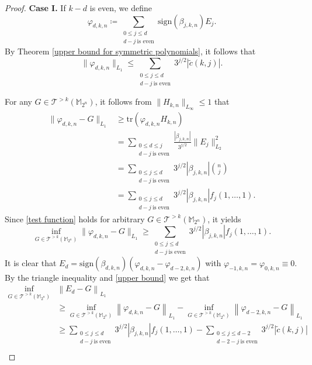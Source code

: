 \documentclass{amsbook}
\theoremstyle{definition}
\theoremstyle{remark}
\numberwithin{section}{chapter}
\numberwithin{equation}{chapter}
\newcommand{\M}{\mathbb{M}}
\newcommand{\1}{\mathbf{1}}
\begin{document}
\begin{proof}
{\bf Case I.} If $k-d$ is even, we define
\[
\varphi_{d,k,n}\coloneqq \sum_{\substack{0\leq j\leq d\\d-j~\mbox{is even}}}\mathrm{sign}(\beta_{j,k,n})E_{j}.
\]
By Theorem \ref{upper bound for symmetric polynomials}, it follows that
\begin{equation}\label{upper bound}
\|\varphi_{d,k,n}\|_{L_{1}}\leq \sum_{\substack{0\leq j\leq d\\d-j~\mbox{is even}}}3^{j/2}|\tilde{c}(k,j)|.
\end{equation}

For any $G\in \mathcal{T}^{>k}(\M_{2^n})$, it follows from $\|H_{k,n}\|_{L_{\infty}}\leq 1$ that
\begin{equation}\label{test function}
\begin{split}
\|\varphi_{d,k,n}-G\|_{L_{1}}&\geq\mathrm{tr}\left(\varphi_{d,k,n} H_{k,n}\right)\\
&=\sum_{\substack{0\leq d\leq j\\d-j~\mbox{is even}}}\frac{|\beta_{j,k,n}|}{3^{j/2}}\|E_{j}\|^{2}_{L_{2}}\\
&=\sum_{\substack{0\leq j\leq d\\ d-j~\mbox{is even}}}3^{j/2}|\beta_{j,k,n}|\binom{n}{j}\\
&=\sum_{\substack{0\leq j\leq d\\d-j~\mbox{is even}}}3^{j/2}|\beta_{j,k,n}|f_{j}(1,\dots,1).
\end{split}
\end{equation}
Since \eqref{test function} holds for arbitrary $G\in \mathcal{T}^{>k}(\mathbb{M}_{2^n})$, it yields
\begin{equation}\label{inf-version}
\inf_{G\in \mathcal{T}^{>k}(\M_{2^n})}\|\varphi_{d,k,n}-G\|_{L_{1}}\geq \sum_{\substack{0\leq j\leq d\\d-j~\mbox{is even}}}3^{j/2}|\beta_{j,k,n}|f_{j}(1,\dots,1).
\end{equation}
It is clear that $E_{d}=\mathrm{sign}(\beta_{d,k,n})(\varphi_{d,k,n}-\varphi_{d-2,k,n})$ with $\varphi_{-1,k,n}=\varphi_{0,k,n}\equiv 0$. By the triangle inequality and \eqref{upper bound} we get that
\begin{align*}
\inf_{G\in \mathcal{T}^{>k}(\M_{2^n})}&\left\|E_{d}-G\right\|_{L_{1}}\\
&\geq \inf_{G\in \mathcal{T}^{>k}(\mathbb{M}_{2^n})}\left\|\varphi_{d,k,n}-G\right\|_{L_{1}}-\inf_{G\in \mathcal{T}^{>k}(\mathbb{M}_{2^n})}\left\|\varphi_{d-2,k,n}-G\right\|_{L_{1}}\\
&\geq \sum_{\substack{0\leq j\leq d\\d-j~\mbox{is even}}}3^{j/2}|\beta_{j,k,n}|f_{j}(1,\dots,1)-\sum_{\substack{0\leq j\leq d-2\\d-2-j~\mbox{is even}}}3^{j/2}|\tilde{c}(k,j)|\\

\end{align*}
\end{proof}
\end{document}
